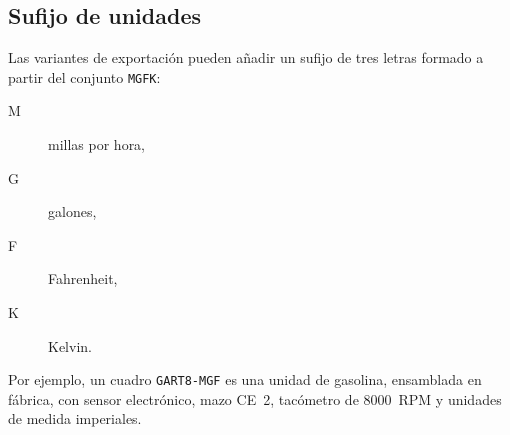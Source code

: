 \subsection{Sufijo de unidades}
Las variantes de exportación pueden añadir un sufijo de tres letras formado a partir del conjunto \texttt{MGFK}:
\begin{description}
    \item[M] millas por hora,
    \item[G] galones,
    \item[F] Fahrenheit,
    \item[K] Kelvin.
\end{description}
Por ejemplo, un cuadro \texttt{GART8-MGF} es una unidad de gasolina, ensamblada en fábrica, con sensor electrónico, mazo CE~2, tacómetro de 8000~RPM y unidades de medida imperiales.


